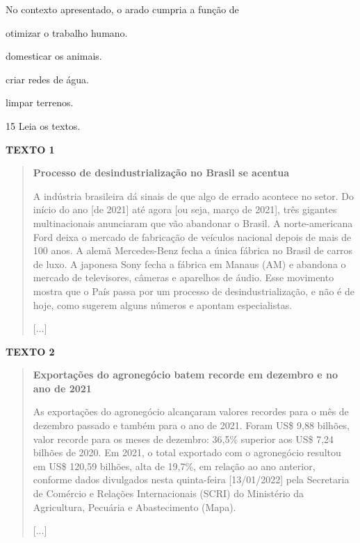 No contexto apresentado, o arado cumpria a função de

\begin{escolha}
\item
  otimizar o trabalho humano.
\item
  domesticar os animais.
\item
  criar redes de água.
\item
  limpar terrenos.
\end{escolha}

\pagebreak
\num{15} Leia os textos.

\textbf{TEXTO 1}

\begin{quote}
\textbf{Processo de desindustrialização no Brasil se acentua}

A indústria brasileira dá sinais de que algo de errado acontece no
setor. Do início do ano [de 2021] até agora [ou seja, março de 2021], três gigantes multinacionais
anunciaram que vão abandonar o Brasil. A norte-americana Ford deixa o
mercado de fabricação de veículos nacional depois de mais de 100 anos. A
alemã Mercedes-Benz fecha a única fábrica no Brasil de carros de luxo. A
japonesa Sony fecha a fábrica em Manaus (AM) e abandona o mercado de
televisores, câmeras e aparelhos de áudio. Esse movimento mostra que o
País passa por um processo de desindustrialização, e não é de hoje, como
sugerem alguns números e apontam especialistas.

{[}...{]}

\end{quote}

\textbf{TEXTO 2}

\begin{quote}
\textbf{Exportações do agronegócio batem recorde em dezembro e no ano de 2021}

As exportações do agronegócio alcançaram valores recordes para o
mês de dezembro passado e também para o ano de 2021. Foram US\$ 9,88
bilhões, valor recorde para os meses de dezembro: 36,5\% superior aos
US\$ 7,24 bilhões de 2020. Em 2021, o total exportado com o agronegócio
resultou em US\$ 120,59 bilhões, alta de 19,7\%, em relação ao ano
anterior, conforme dados divulgados nesta quinta-feira [13/01/2022] pela
Secretaria de Comércio e Relações Internacionais (SCRI) do Ministério da
Agricultura, Pecuária e Abastecimento (Mapa).

{[}...{]}

\end{quote}

